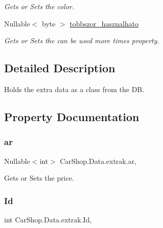\begin{DoxyCompactItemize}
\begin{DoxyCompactList}\small\item\em Gets or Sets the color. \end{DoxyCompactList}\item 
Nullable$<$ byte $>$ \mbox{\hyperlink{class_car_shop_1_1_data_1_1extrak_a93236e77dec6453b89b5a944ba1c34e7}{tobbszor\+\_\+hasznalhato}}
\begin{DoxyCompactList}\small\item\em Gets or Sets the \textquotesingle{}can be used more times\textquotesingle{} property. \end{DoxyCompactList}\end{DoxyCompactItemize}


\subsection{Detailed Description}
Holds the extra data as a class from the DB. 



\subsection{Property Documentation}
\mbox{\label{class_car_shop_1_1_data_1_1extrak_a734697251c8df37e5ebafa94add570b2}} 
\subsubsection{\texorpdfstring{ar}{ar}}
{\footnotesize\ttfamily Nullable$<$int$>$ Car\+Shop.\+Data.\+extrak.\+ar\hspace{0.3cm}{\ttfamily [get]}, {\ttfamily [set]}}



Gets or Sets the price. 

\mbox{\label{class_car_shop_1_1_data_1_1extrak_aa270776237b9d5e360264f39c5ec24ca}} 
\subsubsection{\texorpdfstring{Id}{Id}}
{\footnotesize\ttfamily int Car\+Shop.\+Data.\+extrak.\+Id\hspace{0.3cm}{\ttfamily [get]}, {\ttfamily [set]}}




